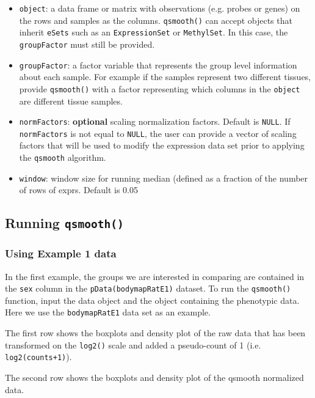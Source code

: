\documentclass{article}\usepackage[]{graphicx}\usepackage[usenames,dvipsnames]{color}
\begin{document}
\begin{itemize}
\item \texttt{object}: a data frame or matrix with observations 
(e.g. probes or genes) on the rows and samples as the columns. 
\texttt{qsmooth()} can accept objects that inherit \texttt{eSets} 
such as an \texttt{ExpressionSet} or \texttt{MethylSet}. In this case, 
the \texttt{groupFactor} must still be provided. 

\item \texttt{groupFactor}: a factor variable that represents 
the group level information about each sample. For example if the 
samples represent two different tissues, provide \texttt{qsmooth()} 
with a factor representing which columns in the \texttt{object} 
are different tissue samples.

\item \texttt{normFactors}: {\bf optional} scaling normalization factors. 
Default is \texttt{NULL}. If \texttt{normFactors} is not equal to 
\texttt{NULL}, the user can provide a vector of scaling factors 
that will be used to modify the expression data set prior to 
applying the \texttt{qsmooth} algorithm.

\item \texttt{window}: window size for running median (defined as a 
fraction of the number of rows of exprs. Default is 0.05
\end{itemize}



\subsection{Running \texttt{qsmooth()}}

\subsubsection{Using Example 1 data}
In the first example, the groups we are interested in comparing are 
contained in the \texttt{sex} column in the \texttt{pData(bodymapRatE1)} 
dataset. To run the \texttt{qsmooth()} function, input the data object 
and the object containing the phenotypic data. Here we use the 
\texttt{bodymapRatE1} data set as an example. 

The first row shows the boxplots and density plot of the raw data that
has been transformed on the \texttt{log2()} scale and added a 
pseudo-count of 1 (i.e. \texttt{log2(counts+1)}).

The second row shows the boxplots and density plot of the qsmooth 
normalized data. 
\end{document}
